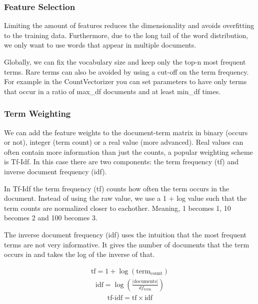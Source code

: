 \subsubsection{Feature Selection}

Limiting the amount of features reduces the dimensionality and
avoids overfitting to the training data. Furthermore, due to the
long tail of the word distribution, we only want to use words that
appear in multiple documents.

Globally, we can fix the vocabulary size and keep only the top-n most
frequent terms. Rare terms can also be avoided by using a cut-off on
the term frequency. For example in the CountVectorizer you can set parameters
to have only terms that occur in a ratio of max\_df documents and at least
min\_df times.

\subsubsection{Term Weighting}

We can add the feature weights to the document-term matrix in binary
(occurs or not),
integer (term count) or a real value (more advanced). Real values can
often contain
more information than just the counts, a popular weighting scheme is
Tf-Idf. In this case
there are two components: the term frequency (tf) and inverse
document frequency (idf).

In Tf-Idf the term frequency (tf) counts how often the term occurs in
the document.
Instead of using the raw value, we use a 1 + log value such that the
term counts are
normalized closer to eachother. Meaning, 1 becomes 1, 10 becomes 2
and 100 becomes 3.

The inverse document frequency (idf) uses the intuition that the most
frequent terms
are not very informative. It gives the number of documents that the
term occurs in and
takes the log of the inverse of that.

\begin{definition}[Tf-Idf]
  \begin{align*}
    \text{tf} = 1 + \log(\text{term}_\text{count})
  \end{align*}
  \begin{align*}
    \text{idf} = \log(\frac{|\text{documents}|}{df_\text{term}})
  \end{align*}
  \begin{align*}
    \text{tf-idf} = \text{tf} \times \text{idf}
  \end{align*}
\end{definition}

